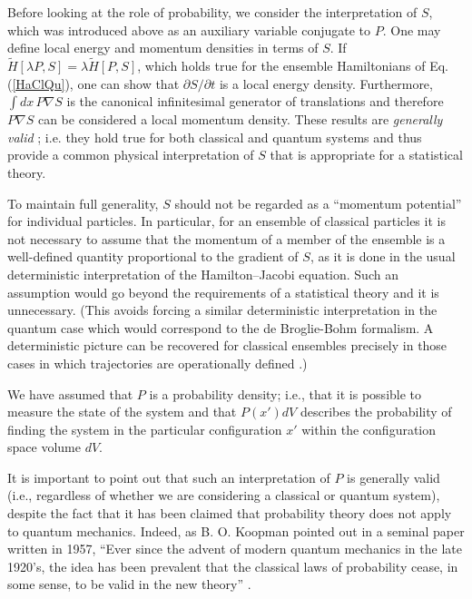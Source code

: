 \documentclass [12pt]{revtex4}
\begin{document}
Before looking at the role of probability, we consider the interpretation of $S$, which was introduced above as an auxiliary variable conjugate to $P$. One may define local energy and momentum densities in terms of $S$. If $\tilde{H}[\lambda P, S] = \lambda \tilde{H}[P,S]$, which holds true for the ensemble Hamiltonians of Eq. (\ref{HaClQu}), one can show that $\partial S/\partial t$ is a local energy density. Furthermore, $\int dx\, P\nabla S$ is the canonical infinitesimal generator of translations and therefore $P\nabla S$ can be considered a local momentum density. These results are {\it generally valid} \cite{RH2009}; i.e. they hold true for both classical and quantum systems and thus provide a common physical interpretation of $S$ that is appropriate for a statistical theory.

To maintain full generality, $S$ should not be regarded as a ``momentum potential'' for individual particles. In particular, for an ensemble of classical particles it is not necessary to assume that the momentum of a member of the ensemble is a well-defined quantity proportional to the gradient of $S$, as it is done in the usual deterministic interpretation of the Hamilton--Jacobi equation. Such an assumption would go beyond the requirements of a statistical theory and it is unnecessary. (This avoids forcing a similar deterministic interpretation in the quantum case which would correspond to the de Broglie-Bohm formalism. A deterministic picture can be recovered for classical ensembles precisely in those cases in which trajectories are operationally defined \cite{HR2005}.)

We have assumed that $P$ is a probability density; i.e., that it is possible to measure the state of the system and that $P(x') dV$ describes the probability of finding the system in the particular configuration $x'$ within the configuration space volume $dV$.

It is important to point out that such an interpretation of $P$ is generally valid (i.e., regardless of whether we are considering a classical or quantum system), despite the fact that it has been claimed that probability theory does not apply to quantum mechanics. Indeed, as B. O. Koopman pointed out in a seminal paper written in 1957, ``Ever since the advent of modern quantum mechanics in the late 1920's, the idea has been prevalent that the classical laws of probability cease, in some sense, to be valid in the new theory'' \cite{K1957}.
\end{document}
